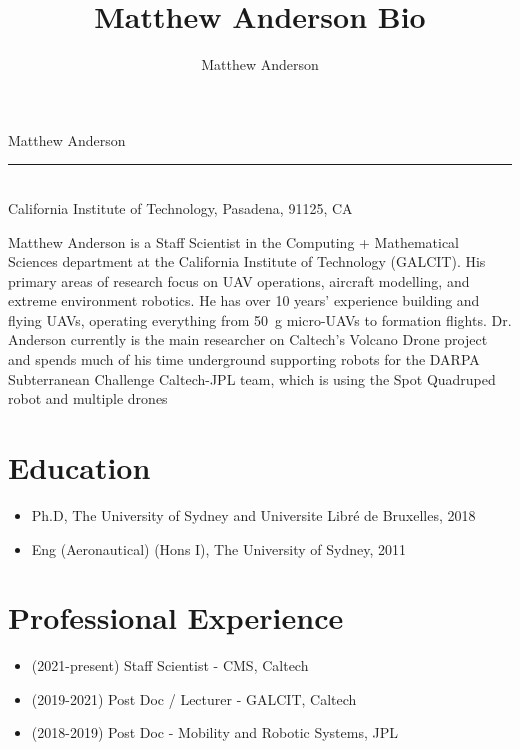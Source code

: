 \documentclass{article}
\title{Matthew Anderson Bio}
\author{Matthew Anderson}
\begin{document}
\thispagestyle{empty} 
\vspace*{\fill}
\vspace{-2cm}

\begin{center}   
    { \Huge
        Matthew Anderson
    } \\
    \vspace{0.1cm} \noindent\rule{7cm}{0.4pt} \vspace{0.1cm}
    \\
    {\large
        California Institute of Technology, Pasadena, 91125, CA
    }
    \vspace{1cm}
\end{center}


Matthew Anderson is a Staff Scientist in the Computing + Mathematical Sciences department at the California Institute of Technology (GALCIT).
His primary areas of research focus on UAV operations, aircraft modelling, and extreme environment robotics. 
He has over 10 years' experience building and flying UAVs, operating everything from 50~g micro-UAVs to formation flights. 
Dr. Anderson currently is the main researcher on Caltech's Volcano Drone project and spends much of his time underground supporting robots for the DARPA Subterranean Challenge Caltech-JPL team, which is using the Spot Quadruped robot and multiple drones

\section*{Education}
\begin{itemize}
 \item Ph.D, The University of Sydney and Universite Libr\'e de Bruxelles, 2018 
 \item Eng (Aeronautical) (Hons I), The University of Sydney, 2011 
\end{itemize}

\section*{Professional Experience}
\begin{itemize}
 \item (2021-present) Staff Scientist - CMS, Caltech 
 \item (2019-2021) Post Doc / Lecturer - GALCIT, Caltech 
 \item (2018-2019) Post Doc - Mobility and Robotic Systems, JPL 
\end{itemize}
\end{document}
